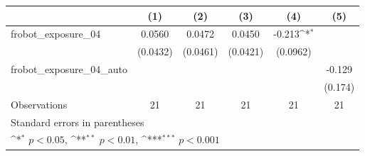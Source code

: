{
\def\sym#1{\ifmmode^{#1}\else\(^{#1}\)\fi}
\begin{tabular}{l*{5}{c}}
\toprule
                    &\multicolumn{1}{c}{(1)}         &\multicolumn{1}{c}{(2)}         &\multicolumn{1}{c}{(3)}         &\multicolumn{1}{c}{(4)}         &\multicolumn{1}{c}{(5)}         \\
\midrule
frobot\_exposure\_04  &      0.0560         &      0.0472         &      0.0450         &      -0.213\sym{*}  &                     \\
                    &    (0.0432)         &    (0.0461)         &    (0.0421)         &    (0.0962)         &                     \\
\addlinespace
frobot\_exposure\_04\_auto&                     &                     &                     &                     &      -0.129         \\
                    &                     &                     &                     &                     &     (0.174)         \\
\midrule
Observations        &          21         &          21         &          21         &          21         &          21         \\
\bottomrule
\multicolumn{6}{l}{\footnotesize Standard errors in parentheses}\\
\multicolumn{6}{l}{\footnotesize \sym{*} \(p<0.05\), \sym{**} \(p<0.01\), \sym{***} \(p<0.001\)}\\
\end{tabular}
}
